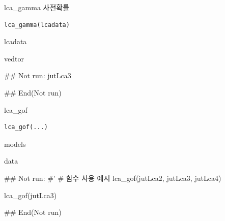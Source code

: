 \documentclass[a4paper]{book}
\begin{document}
%
\begin{Description}
lca\_gamma 사전확률
\end{Description}
%
\begin{Usage}
\begin{verbatim}
lca_gamma(lcadata)
\end{verbatim}
\end{Usage}
%
\begin{Arguments}
\begin{ldescription}
\item[\code{lcadata}] lcadata
\end{ldescription}
\end{Arguments}
%
\begin{Value}
vedtor
\end{Value}
%
\begin{Examples}
\begin{ExampleCode}
## Not run: 
jutLca3%

## End(Not run)
\end{ExampleCode}
\end{Examples}
%
\begin{Description}
lca\_gof
\end{Description}
%
\begin{Usage}
\begin{verbatim}
lca_gof(...)
\end{verbatim}
\end{Usage}
%
\begin{Arguments}
\begin{ldescription}
\item[\code{...}] models
\end{ldescription}
\end{Arguments}
%
\begin{Value}
data
\end{Value}
%
\begin{Examples}
\begin{ExampleCode}

## Not run: 
#'
# 함수 사용 예시
lca_gof(jutLca2, jutLca3, jutLca4)

lca_gof(jutLca3)%

## End(Not run)
\end{ExampleCode}
\end{Examples}
\end{document}
